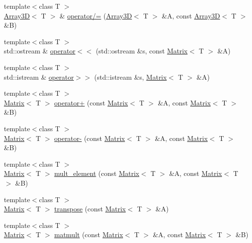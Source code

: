 \begin{DoxyCompactItemize}
\item 
{\footnotesize template$<$class T $>$ }\\\hyperlink{classTNT_1_1Array3D}{Array3D}$<$ T $>$ \& \hyperlink{namespaceTNT_adc8dc2db8d115a87af465d1d502bece1}{operator/=} (\hyperlink{classTNT_1_1Array3D}{Array3D}$<$ T $>$ \&A, const \hyperlink{classTNT_1_1Array3D}{Array3D}$<$ T $>$ \&B)
\item 
{\footnotesize template$<$class T $>$ }\\std\+::ostream \& \hyperlink{namespaceTNT_a35dd0a4b8055b08b5ff492b27691e77e}{operator$<$$<$} (std\+::ostream \&s, const \hyperlink{classTNT_1_1Matrix}{Matrix}$<$ T $>$ \&A)
\item 
{\footnotesize template$<$class T $>$ }\\std\+::istream \& \hyperlink{namespaceTNT_a7b2afad2ac4a2fba0673ddd9f95a8cb6}{operator$>$$>$} (std\+::istream \&s, \hyperlink{classTNT_1_1Matrix}{Matrix}$<$ T $>$ \&A)
\item 
{\footnotesize template$<$class T $>$ }\\\hyperlink{classTNT_1_1Matrix}{Matrix}$<$ T $>$ \hyperlink{namespaceTNT_aac8c4cff00d07216b49f509ca2ba5833}{operator+} (const \hyperlink{classTNT_1_1Matrix}{Matrix}$<$ T $>$ \&A, const \hyperlink{classTNT_1_1Matrix}{Matrix}$<$ T $>$ \&B)
\item 
{\footnotesize template$<$class T $>$ }\\\hyperlink{classTNT_1_1Matrix}{Matrix}$<$ T $>$ \hyperlink{namespaceTNT_ad00860a15fba14ffc48b8a3c620aee8f}{operator-\/} (const \hyperlink{classTNT_1_1Matrix}{Matrix}$<$ T $>$ \&A, const \hyperlink{classTNT_1_1Matrix}{Matrix}$<$ T $>$ \&B)
\item 
{\footnotesize template$<$class T $>$ }\\\hyperlink{classTNT_1_1Matrix}{Matrix}$<$ T $>$ \hyperlink{namespaceTNT_a008b866b3938af612e303fa477b844bc}{mult\+\_\+element} (const \hyperlink{classTNT_1_1Matrix}{Matrix}$<$ T $>$ \&A, const \hyperlink{classTNT_1_1Matrix}{Matrix}$<$ T $>$ \&B)
\item 
{\footnotesize template$<$class T $>$ }\\\hyperlink{classTNT_1_1Matrix}{Matrix}$<$ T $>$ \hyperlink{namespaceTNT_ab22c518de961e96e4a654ce4b4c6b948}{transpose} (const \hyperlink{classTNT_1_1Matrix}{Matrix}$<$ T $>$ \&A)
\item 
{\footnotesize template$<$class T $>$ }\\\hyperlink{classTNT_1_1Matrix}{Matrix}$<$ T $>$ \hyperlink{namespaceTNT_a53e97abb43a5114bbcdc7d2687b19349}{matmult} (const \hyperlink{classTNT_1_1Matrix}{Matrix}$<$ T $>$ \&A, const \hyperlink{classTNT_1_1Matrix}{Matrix}$<$ T $>$ \&B)

\end{DoxyCompactItemize}
